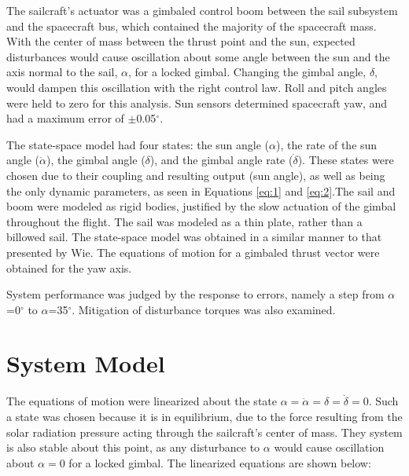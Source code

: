 \documentclass[]{aiaa-tc}%
\begin{document}
	\vspace{5 mm}
	
The sailcraft's actuator was a gimbaled control boom between the sail subsystem and the spacecraft bus, which contained the majority of the spacecraft mass.  With the center of mass between the thrust point and the sun, expected disturbances would cause oscillation about some angle between the sun and the axis normal to the sail, $\alpha$, for a locked gimbal.  Changing the gimbal angle, $\delta$, would dampen this oscillation with the right control law. Roll and pitch angles were held to zero for this analysis. Sun sensors determined spacecraft yaw, and had a maximum error of $\pm$0.05$^{\circ}$.
	
	\vspace{5 mm}

The state-space model had four states: the sun angle ($\alpha$), the rate of the sun angle ($\dot{\alpha}$), the gimbal angle ($\delta$), and the gimbal angle rate ($\dot{\delta}$). These states were chosen due to their coupling and resulting output (sun angle), as well as being the only dynamic parameters, as seen in Equations \ref{eq:1} and \ref{eq:2}.The sail and boom were modeled as rigid bodies, justified by the slow actuation of the gimbal throughout the flight. The sail was modeled as a thin plate, rather than a billowed sail. The state-space model was obtained in a similar manner to that presented by Wie\cite{WieSolarSail2}. The equations of motion for a gimbaled thrust vector were obtained for the yaw axis. 
	
	\vspace{5 mm}

System performance was judged by the response to errors, namely a step from $\alpha$=0$^{\circ}$ to $\alpha$=35$^{\circ}$. Mitigation of disturbance torques was also examined.

	\section{System Model}

	The equations of motion were linearized about the state $\alpha = \dot{\alpha} = \delta = \dot{\delta} =0$. Such a state was chosen because it is in equilibrium, due to the force resulting from the solar radiation pressure acting through the sailcraft's center of mass. They system is also stable about this point, as any disturbance to $\alpha$ would cause oscillation about $\alpha=0$ for a locked gimbal. The linearized equations are shown below\cite{WieSolarSail2}:
\end{document}
